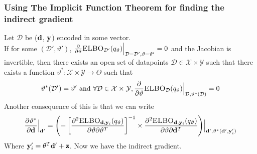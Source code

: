 \subsubsection{Using The Implicit Function Theorem for finding the indirect gradient}
Let $\mathcal{D}$ be ($\mathbf{d}$, $\mathbf{y}$) encoded in some vector.\\
If for some $(\mathcal{D}', \vartheta')$, $\frac{\partial }{\partial \vartheta} \textsc{ELBO}_{\mathcal{D}'} (q_\vartheta)\Bigr\rvert_{\mathcal{D}=\mathcal{D}', \vartheta=\vartheta'} = 0$
and the Jacobian is invertible, then there exists an open set of datapoints $\mathcal{D} \in \mathcal{X} \times \mathcal{Y}$ 
such that there exists a function $\vartheta^* \colon \mathcal{X} \times \mathcal{Y} \rightarrow \Theta $ such that
$$\vartheta^*(\mathcal{D}')= \vartheta' \textrm{ and }\forall \mathcal{D} \in \mathcal{X}\times \mathcal{Y}, \frac{\partial }{\partial \vartheta}\textsc{ELBO}_\mathcal{D} (q_\vartheta)\Bigr\rvert_{\mathcal{D}, \vartheta^*(\mathcal{D})} = 0$$
Another consequence of this is that we can write
$$\frac{\partial \vartheta^*}{\partial \mathbf{d}}\Bigr\rvert_{\mathbf{d}'} = \left(- \left[\frac{\partial^2 \textsc{ELBO}_{\mathbf{d}, \mathbf{y}_i}(q_\vartheta)}{\partial \vartheta \partial \vartheta^T}\right]^{-1}\times \frac{\partial^2 \textsc{ELBO}_{\mathbf{d}, \mathbf{y}_i}(q_\vartheta)}{\partial \vartheta \partial \mathbf{d}^T}\right)\Bigr\rvert_{\mathbf{d}', \vartheta^*(\mathbf{d}', \mathbf{y}'_i)}$$
Where $\mathbf{y}_i' = \theta^T\mathbf{d}' + \mathbf{z}$.
Now we have the indirect gradient.
